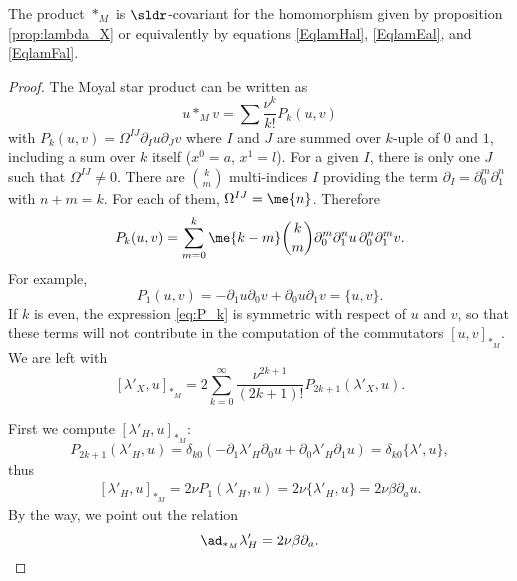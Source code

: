 \begin{proposition}
   The product $\ast_M$ is $\sldr$-covariant for the homomorphism given by proposition \ref{prop:lambda_X} or equivalently by equations \eqref{EqlamHal}, \eqref{EqlamEal}, and \eqref{EqlamFal}.
\end{proposition}

\begin{proof}
The Moyal star product can be written as
\[
   u\ast_M v=\sum \frac{\nu^k}{k!}P_k(u,v)
\]
with $P_k(u,v)=\Omega^{IJ}\partial_Iu\partial_Jv$ where $I$ and $J$ are summed over $k$-uple of $0$ and $1$, including a sum over $k$ itself ($x^0=a$, $x^1=l$). For a given $I$, there is only one $J$ such that $\Omega^{IJ}\neq 0$. There are $\binom{k}{m}$ multi-indices $I$ providing the term $\partial_I=\partial_0^m\partial_1^n$ with $n+m=k$. For each of them, $\Omega^{IJ}=\me{n}$. Therefore
\begin{equation}\label{eq:P_k}
  P_k(u,v)=\sum_{m=0}^k\me{k-m}\binom{k}{m}\partial_0^m\partial_1^nu\,\partial_0^n\partial_1^mv.
\end{equation}
For example,
\[
  P_1(u,v)=-\partial_1u\partial_0v+\partial_0u\partial_1v=\{u,v\}.
\]
If $k$ is even, the expression \eqref{eq:P_k} is symmetric with respect of $u$ and $v$, so that these terms will not contribute in the computation of the commutators $[u,v]_{\ast_M}$. We are left with
\begin{equation}\label{eq:comm_lambda_X}
   [\lambda'_X,u]_{\ast_M}
         =2\sum_{k=0}^{\infty}\frac{\nu^{2k+1}}{(2k+1)!}P_{2k+1}(\lambda'_X,u).
\end{equation}

First we compute $[\lambda'_H,u]_{\ast_M}$:
\begin{equation}
   P_{2k+1}(\lambda'_H,u)=\delta_{k0}(-\partial_1\lambda'_H\partial_0 u+\partial_0\lambda'_H\partial_1 u)=\delta_{k0}\{\lambda',u\},
\end{equation}
thus
\begin{equation}
\begin{split}
  [\lambda'_H,u]_{\ast_M}=2\nu P_1(\lambda'_H,u)
                        =2\nu\{\lambda'_H,u\}
			=2\nu\beta\partial_au.
\end{split}
\end{equation}
By the way, we point out the relation
\[
\ad_{\ast_M}\lambda'_H=2\nu\beta\partial_a.
\]


\end{proof}
